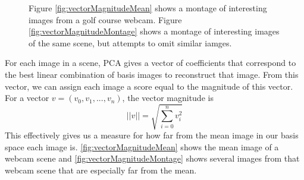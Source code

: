 \begin{figure}
	\centering
		\caption[Focusing on object edges with gradient magnitude images.]{Figure \ref{fig:vectorMagnitudeMean} shows a montage of interesting images from a golf course webcam. Figure \ref{fig:vectorMagnitudeMontage} shows a montage of interesting images of the same scene, but attempts to omit similar iamges.}
\end{figure}

For each image in a scene, PCA gives a vector of coefficients that correspond to the best linear combination of basis images to reconstruct that image.  From this vector, we can assign each image a score equal to the magnitude of this vector.  For a vector $v = (v_0, v_1, ..., v_n)$, the vector magnitude is $$||v||=\sqrt{\sum_{i=0}^nv_i^2}$$This effectively gives us a measure for how far from the mean image in our basis space each image is.   \ref{fig:vectorMagnitudeMean} shows the mean image of a webcam scene and \ref{fig:vectorMagnitudeMontage} shows several images from that webcam scene that are especially far from the mean.

